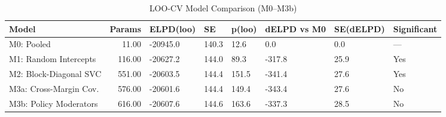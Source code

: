 \begin{table}[htbp]
\centering
\begin{tabular}{lrllllll}
  \toprule
Model & Params & ELPD(loo) & SE & p(loo) & dELPD vs M0 & SE(dELPD) & Significant \\ 
  \midrule
M0: Pooled & 11.00 & -20945.0 & 140.3 & 12.6 & 0.0 & 0.0 & --- \\ 
  M1: Random Intercepts & 116.00 & -20627.2 & 144.0 & 89.3 & -317.8 & 25.9 & Yes \\ 
  M2: Block-Diagonal SVC & 551.00 & -20603.5 & 144.4 & 151.5 & -341.4 & 27.6 & Yes \\ 
  M3a: Cross-Margin Cov. & 576.00 & -20601.6 & 144.4 & 149.4 & -343.4 & 27.6 & No \\ 
  M3b: Policy Moderators & 616.00 & -20607.6 & 144.6 & 163.6 & -337.3 & 28.5 & No \\ 
   \bottomrule
\end{tabular}
\caption{LOO-CV Model Comparison (M0--M3b)} 
\end{table}

